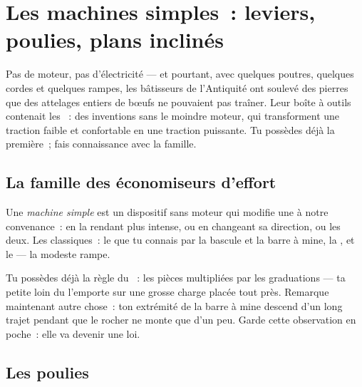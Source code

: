 \chapter{Les machines simples~: leviers, poulies, plans inclinés}\label{ch:g5:simple-machines}

Pas de moteur, pas d'électricité --- et pourtant, avec quelques
poutres, quelques cordes et quelques rampes, les bâtisseurs de
l'Antiquité ont soulevé des pierres que des attelages entiers de
bœufs ne pouvaient pas traîner. Leur boîte à outils contenait les
\emph{}~: des inventions sans le moindre moteur, qui
transforment une traction faible et confortable en une traction
puissante. Tu possèdes déjà la première~; fais connaissance avec la
famille.

\section{La famille des économiseurs d'effort}

\begin{definition}\label{def:g5:simple-machines:machine}
Une \emph{machine simple} est un dispositif
sans moteur qui modifie une  à notre convenance~: en la rendant
plus intense, ou en changeant sa direction, ou les deux. Les
classiques~: le \emph{} que tu connais par la bascule et la
barre à mine, la \emph{}, et le \emph{} --- la
modeste rampe.
\end{definition}

\begin{example}\label{ex:g5:simple-machines:lever}
Tu possèdes déjà la règle du ~: les pièces multipliées par les
graduations --- ta petite  loin du  l'emporte sur une
grosse charge placée tout près. Remarque maintenant autre chose~: ton
extrémité de la barre à mine descend d'un long trajet pendant que le
rocher ne monte que d'un peu. Garde cette observation en poche~: elle
va devenir une loi.
\end{example}

\section{Les poulies}

